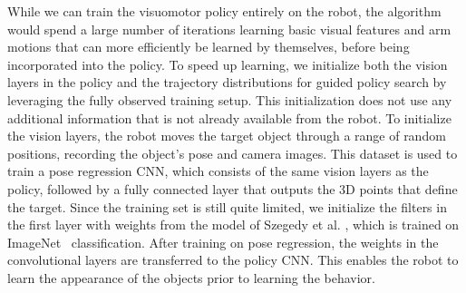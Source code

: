 \documentclass[conference]{IEEEtran}
\begin{document}
While we can train the visuomotor policy entirely on the robot, the algorithm would spend a large number of iterations learning basic visual features and arm motions that can more efficiently be learned by themselves, before being incorporated into the policy. To speed up learning, we initialize both the vision layers in the policy and the trajectory distributions for guided policy search by leveraging the fully observed training setup. This initialization does not use any additional information that is not already available from the robot. To initialize the vision layers, the robot moves the target object through a range of random positions, recording the object's pose and camera images. This dataset is used to train a pose regression CNN, which consists of the same vision layers as the policy, followed by a fully connected layer that outputs the 3D points that define the target. Since the training set is still quite limited, we initialize the filters in the first layer with weights from the model of Szegedy et al. \cite{sljsr-gdwc-14}, which is trained on ImageNet~\cite{ddsll-lshid-09} classification. After training on pose regression, the weights in the convolutional layers are transferred to the policy CNN. This enables the robot to learn the appearance of the objects prior to learning the behavior.
\end{document}
